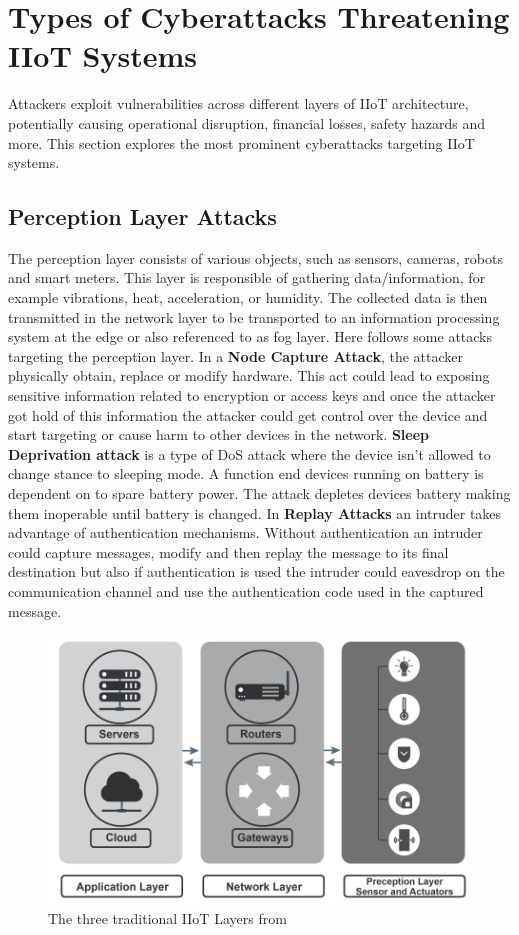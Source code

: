 \documentclass[article,a4paper]{IEEEtran}
\begin{document}
\section{Types of Cyberattacks Threatening IIoT Systems}
Attackers exploit vulnerabilities across different layers of IIoT architecture, potentially causing operational disruption, financial losses, safety hazards and more. This section explores the most prominent cyberattacks targeting IIoT systems. 
\subsection{Perception Layer Attacks}
The perception layer consists of various objects, such as sensors, cameras, robots and smart meters. This layer is responsible of gathering data/information, for example vibrations, heat, acceleration, or humidity. The collected data is then transmitted in the network layer to be transported to an information processing system at the edge or also referenced to as fog layer. Here follows some attacks targeting the perception layer.
\newline\newline
In a \textbf{Node Capture Attack}, the attacker physically obtain, replace or modify hardware. This act could lead to exposing sensitive information related to encryption or access keys and once the attacker got hold of this information the attacker could get control over the device and start targeting or cause harm to other devices in the network. 
\newline
\textbf{Sleep Deprivation attack} is a type of DoS attack where the device isn't allowed to change stance to sleeping mode. A function end devices running on battery is dependent on to spare battery power. The attack depletes devices battery making them inoperable until battery is changed. 
\newline
In \textbf{Replay Attacks} an intruder takes advantage of authentication mechanisms. Without authentication an intruder could capture messages, modify and then replay the message to its final destination but also if authentication is used the intruder could eavesdrop on the communication channel and use the authentication code used in the captured message. 
\begin{figure}
    \includegraphics[width=\columnwidth]{LayersIIoT.png}
    \caption{ The three traditional IIoT Layers from \cite{SurveySecurity} }
    \label{fig1: IIoT layers }
\end{figure}
\end{document}
